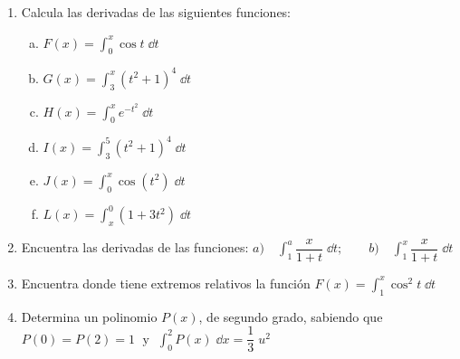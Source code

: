 \begin{enumerate}
\rightline{\textcolor{gris}{Sol: Sí, el valor es $2$}}


\item Calcula las derivadas de las siguientes funciones:

\begin{multicols}{2}
\begin{enumerate}[a) ]
\item $F(x)=\displaystyle \int_{0}^{x} \cos t \; \dd t$
\item $G(x)=\displaystyle \int_{3}^{x} (t^2+1)^4 \; \dd t$
\item $H(x)=\displaystyle \int_{0}^{x} e^{-t^2} \; \dd t$
\item $I(x)=\displaystyle \int_{3}^{5} (t^2+1)^4 \; \dd t$
\item $J(x)=\displaystyle \int_{0}^{x} \cos (t^2) \; \dd t$
\item $L(x)=\displaystyle \int_{x}^{0}  (1+3t^2) \; \dd t$
\end{enumerate}	
\end{multicols}


\rightline{\textcolor{gris}{$ I'(x)=0\; \quad  J'(x)=\cos (x^2); \quad L'(x)=-1-3x^2$ }}

\item Encuentra las derivadas de las funciones:
$a)\quad \displaystyle \int_1^a \dfrac {x}{1+t}\; \dd t; \qquad b) \quad \int_1^x \dfrac {x}{1+t}\; \dd t$

\item Encuentra donde tiene extremos relativos la función $F(x)=\displaystyle \int_1^x \cos^2 t\; \dd t$

\rightline{\textcolor{gris}{Sol: $\; \pi/2\; $ y $\; 3\pi/2$}}

\item Determina un polinomio $P(x)$, de segundo grado, sabiendo que $P(0)=P(2)=1\;  \text { y } \; \displaystyle \int_0^2 P(x)\; \dd x =\dfrac 1 3 \; u^2$
 


\end{enumerate}
